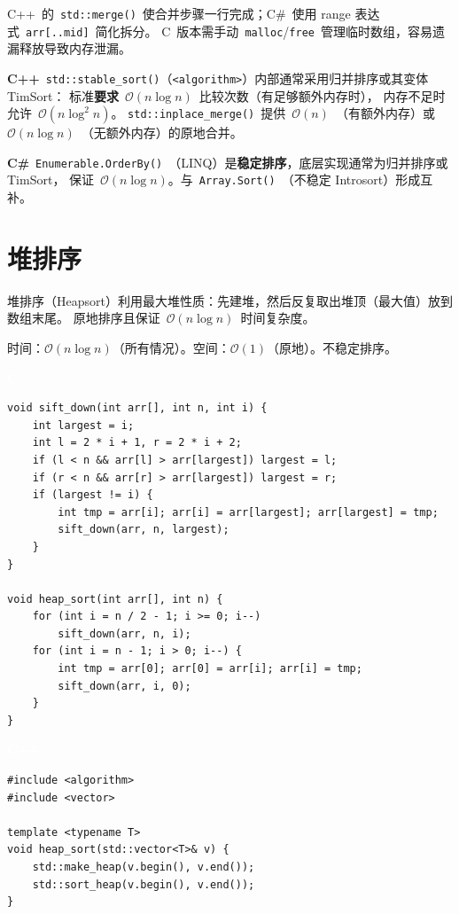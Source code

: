 \documentclass[12pt,a4paper,fontset=fandol]{ctexbook}
\newcommand{\clabel}{%
  \noindent\begin{tcolorbox}[sharp corners,colback=cheadbg,colframe=cheadbg,
    left=6pt,right=6pt,top=2pt,bottom=2pt,boxrule=0pt]
  \textcolor{white}{\small\bfseries\sffamily C}\end{tcolorbox}%
}
\newcommand{\cpplabel}{%
  \noindent\begin{tcolorbox}[sharp corners,colback=cppheadbg,colframe=cppheadbg,
    left=6pt,right=6pt,top=2pt,bottom=2pt,boxrule=0pt]
  \textcolor{white}{\small\bfseries\sffamily C++}\end{tcolorbox}%
}
\newcommand{\bigO}[1]{\mathcal{O}(#1)}
\newcommand{\header}[1]{\texttt{<#1>}}
\newcommand{\Fn}[1]{\texttt{#1()}}
\begin{document}
\begin{compare}
C++~的~\Fn{std::merge}~使合并步骤一行完成；C\#~使用 range 表达式~\texttt{arr[..mid]}~简化拆分。
C~版本需手动~\texttt{malloc}/\allowbreak{}\texttt{free}~管理临时数组，容易遗漏释放导致内存泄漏。
\end{compare}

\begin{stdspec}[title=归并排序相关标准库]
\textbf{C++}~\Fn{std::stable\_sort}（\header{algorithm}）内部通常采用归并排序或其变体 TimSort：
标准\textbf{要求}~$\bigO{n\log n}$~比较次数（有足够额外内存时），
内存不足时允许~$\bigO{n\log^2 n}$。
\Fn{std::inplace\_merge}~提供~$\bigO{n}$~（有额外内存）或~$\bigO{n\log n}$~（无额外内存）的原地合并。

\textbf{C\#}~\Fn{Enumerable.OrderBy}~（LINQ）是\textbf{稳定排序}，底层实现通常为归并排序或 TimSort，
保证~$\bigO{n\log n}$。与~\Fn{Array.Sort}~（不稳定 Introsort）形成互补。
\end{stdspec}

\chapter{堆排序}

堆排序（Heapsort）利用最大堆性质：先建堆，然后反复取出堆顶（最大值）放到数组末尾。
原地排序且保证~$\bigO{n \log n}$~时间复杂度。

\begin{complexitybox}
  时间：$\bigO{n \log n}$（所有情况）。空间：$\bigO{1}$（原地）。不稳定排序。
\end{complexitybox}

\clabel
\begin{lstlisting}[style=cstyle]
void sift_down(int arr[], int n, int i) {
    int largest = i;
    int l = 2 * i + 1, r = 2 * i + 2;
    if (l < n && arr[l] > arr[largest]) largest = l;
    if (r < n && arr[r] > arr[largest]) largest = r;
    if (largest != i) {
        int tmp = arr[i]; arr[i] = arr[largest]; arr[largest] = tmp;
        sift_down(arr, n, largest);
    }
}

void heap_sort(int arr[], int n) {
    for (int i = n / 2 - 1; i >= 0; i--)
        sift_down(arr, n, i);
    for (int i = n - 1; i > 0; i--) {
        int tmp = arr[0]; arr[0] = arr[i]; arr[i] = tmp;
        sift_down(arr, i, 0);
    }
}
\end{lstlisting}

\cpplabel
\begin{lstlisting}[style=cppstyle]
#include <algorithm>
#include <vector>

template <typename T>
void heap_sort(std::vector<T>& v) {
    std::make_heap(v.begin(), v.end());
    std::sort_heap(v.begin(), v.end());
}
\end{lstlisting}
\end{document}
